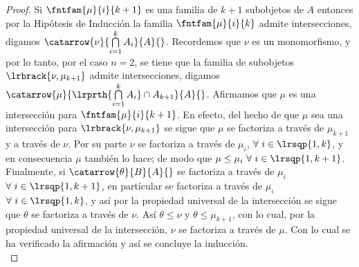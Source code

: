 \documentclass{article}
\begin{document}
\begin{enumerate}[label=\textbf{Ej \arabic*.}]
\begin{proof}
			Si $\fntfam{\mu}{i}{k+1}$ es una familia de $k+1$ subobjetos de $A$ entonces por la Hipótesis de Inducción la familia $\fntfam{\mu}{i}{k}$  admite intersecciones, digamos $\catarrow{\nu}{\bigcap\limits_{i=1}^{k}A_i}{A}{}$. Recordemos que $\nu$ es un monomorfismo, y por lo tanto, por el caso $n=2$, se tiene que la familia de subobjetos $\lrbrack{\nu,\mu_{k+1}}$ admite intersecciones, digamos $\catarrow{\mu}{\lrprth{\bigcap\limits_{i=1}^{k}A_i}\cap A_{k+1}}{A}{}$. Afirmamos que $\mu$ es una intersección para $\fntfam{\mu}{i}{k+1}$. En efecto, del hecho de que $\mu$ sea una intersección para $\lrbrack{\nu,\mu_{k+1}}$ se sigue que $\mu$ se factoriza a través de $\mu_{k+1}$ y a través de $\nu$. Por su parte $\nu$ se factoriza a través de $\mu_i$, $\forall\ i\in\lrsqp{1,k}$, y en consecuencia $\mu$ también lo hace; de modo que $\mu\leq\mu_i\ \forall\ i\in\lrsqp{1,k+1}$. Finalmente, si $\catarrow{\theta}{B}{A}{}$ se factoriza a través de $\mu_i$ $\forall\ i\in\lrsqp{1,k+1}$, en partícular se factoriza a través de $\mu_i$ $\forall\ i\in\lrsqp{1,k}$, y así por la propiedad universal de la intersección se sigue que $\theta$ se factoriza a través de $\nu$. Así $\theta\leq \nu$ y $\theta\leq \mu_{k+1}$, con lo cual, por la propiedad universal de la intersección, $\nu$ se factoriza a través de $\mu$. Con lo cual se ha verificado la afirmación y así se concluye la inducción.\\
		\end{proof}
	\end{enumerate}	
\end{document}

